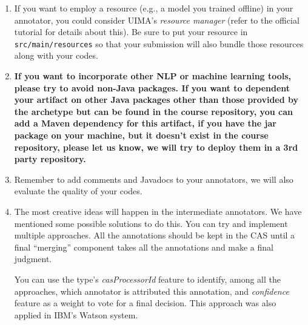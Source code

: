\begin{enumerate}

\item If you want to employ a resource (e.g., a model you trained offline) in
your annotator, you could consider UIMA's \emph{resource manager} (refer to the
official tutorial for details about this).
Be sure to put your resource in \texttt{src/main/resources} so that your
submission will also bundle those resources along with your codes.

\item \textbf{If you want to incorporate other NLP or machine learning tools,
please try to avoid non-Java packages. If you want to dependent your artifact on
other Java packages other than those provided by the archetype but can be found
in the course repository, you can add a Maven dependency for this artifact, if
you have the jar package on your machine, but it doesn't exist in the course
repository, please let us know, we will try to deploy them in a 3rd party
repository.}

\item Remember to add comments and Javadocs to your annotators, we will also
evaluate the quality of your codes.

\item The most creative ideas will happen in the intermediate annotators. We
have mentioned some possible solutions to do this. You can try and implement
multiple approaches. All the annotations should be kept in the CAS until a final
``merging'' component takes all the annotations and make a final judgment.

You can use the type's \emph{casProcessorId} feature to identify, among all the
approaches, which annotator is attributed this annotation, and \emph{confidence}
feature as a weight to vote for a final decision. This approach was also applied
in IBM's Watson system.

\end{enumerate}
